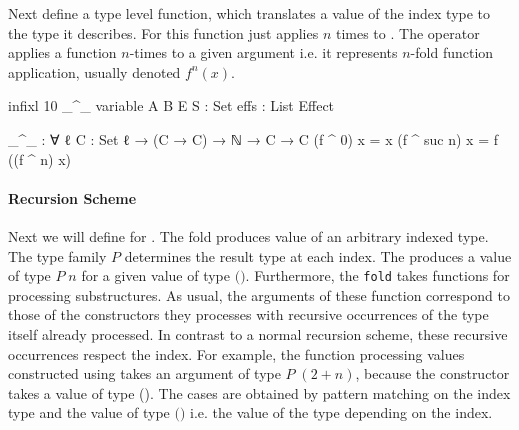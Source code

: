 Next \textcite{DBLP:journals/corr/abs-1806-05230} define a type level function,
which translates a value of the index type to the type it describes.
For
\AgdaSpace{}\AgdaSpace{}
this function just applies \AgdaSpace{}
$n$ times to .
The operator \AgdaFunction{\_\textasciicircum\_} applies a function $n$-times to
a given argument  i.e. it represents $n$-fold function
application, usually denoted $f^n(x)$.

\begin{code}[hide]
infixl 10 _^_
variable
  A B E S : Set
  effs : List Effect
\end{code}
\begin{code}
_^_ : ∀ {ℓ} {C : Set ℓ} → (C → C) → ℕ → C → C
(f ^ 0)      x = x
(f ^ suc n)  x = f ((f ^ n) x)
\end{code}

\paragraph{Recursion Scheme} Next we will define  for
\AgdaSpace{}\AgdaSpace{}.
The fold produces value of an arbitrary  indexed type.
The type family $P$ determines the result type at each index.
The  produces a value of type $P\;n$ for a given value of
type
$($\AgdaSpace{}\AgdaSpace{}\AgdaFunction{\textasciicircum}\AgdaSpace{}$)$\AgdaSpace{}.
Furthermore, the \texttt{fold} takes functions for processing substructures.
As usual, the arguments of these function correspond to those of the
constructors they processes with recursive occurrences of the type itself already
processed.
In contrast to a normal recursion scheme, these recursive occurrences respect
the index.
For example, the function processing values constructed using
 takes an argument of type $P\;(2 + n)$, because
the constructor takes a value of type 
\AgdaSpace{}\AgdaSpace{}(\AgdaSpace{}\AgdaSpace{}).
The cases are obtained by pattern matching on the index type and the value of
type
$($\AgdaSpace{}\AgdaSpace{}\AgdaFunction{\textasciicircum}\AgdaSpace{}$)$\AgdaSpace{}
i.e. the value of the type depending on the index.

